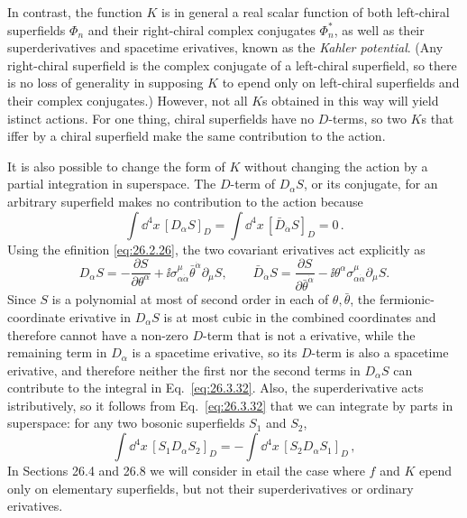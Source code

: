 In contrast, the function $K$ is in general a real scalar function of both
left-chiral superfields $\Phi_n$ and their right-chiral complex conjugates
$\Phi_n^*$, as well as their superderivatives and spacetime \dd erivatives,
known as the \emph{Kahler potential}. (Any right-chiral superfield is the
complex conjugate of a left-chiral superfield, so there is no loss of
generality in supposing $K$ to \dd epend only on left-chiral superfields and
their complex conjugates.) However, not all $K$s obtained in this way will
yield \dd istinct actions. For one thing, chiral superfields have no $D$-terms,
so two $K$s that \dd iffer by a chiral superfield make the same contribution to
the action.

It is also possible to change the form of $K$ without changing the action by a
partial integration in superspace. The $D$-term of \(D_\alpha S\), or its
conjugate, for an arbitrary superfield makes no contribution to the
action because
\begin{equation}
  \int \dd^4x\,[D_\alpha S]_D
  =\int \dd^4x\,[\bar D_{\dot\alpha}S]_D=0\,.
  \tag{26.3.32}\label{eq:26.3.32}
\end{equation}
Using the \dd efinition \eqref{eq:26.2.26}, the two covariant \dd erivatives act
explicitly as
\[
  D_\alpha S
  =-\frac{\partial S}{\partial\theta^\alpha}
    +\ii\sigma^\mu_{\alpha\dot\alpha}\bar\theta^{\dot\alpha}
      \partial_\mu S,
  \qquad
  \bar D_{\dot\alpha}S
  =\frac{\partial S}{\partial\bar\theta^{\dot\alpha}}
    -\ii\theta^\alpha\sigma^\mu_{\alpha\dot\alpha}\partial_\mu S.
\]
Since \(S\) is a polynomial at most of second order in each of
\(\theta,\bar\theta\), the fermionic-coordinate \dd erivative in
\(D_\alpha S\) is at most cubic in the combined coordinates and
therefore cannot have a non-zero $D$-term that is not a \dd erivative, while the
remaining term in \(D_\alpha\) is a spacetime \dd erivative, so its \(D\)-term is
also a
spacetime \dd erivative, and therefore neither the first nor the second terms in
\(D_\alpha S\) can contribute to the integral in
Eq.~\eqref{eq:26.3.32}. Also, the superderivative acts \dd istributively, so it
follows from Eq.~\eqref{eq:26.3.32} that we can integrate by parts in
superspace: for any two bosonic superfields $S_1$ and $S_2$,
\begin{equation}
  \int \dd^4x\,[S_1D_\alpha S_2]_D
  =-\int \dd^4x\,[S_2D_\alpha S_1]_D\,,
  \tag{26.3.33}\label{eq:26.3.33}
\end{equation}
In Sections 26.4 and 26.8 we will consider in \dd etail the case where $f$ and
$K$ \dd epend only on elementary superfields, but not their superderivatives or
ordinary \dd erivatives.

